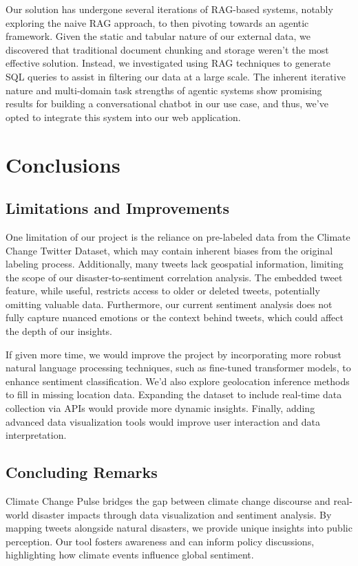 \documentclass[pdflatex,sn-mathphys-num]{sn-jnl}%
\theoremstyle{thmstyleone}%
\theoremstyle{thmstyletwo}%
\theoremstyle{thmstylethree}%
\begin{document}
Our solution has undergone several iterations of RAG-based systems, notably exploring the naive RAG approach, to then pivoting towards an agentic framework. Given the static and tabular nature of our external data, we discovered that traditional document chunking and storage weren't the most effective solution. Instead, we investigated using RAG techniques to generate SQL queries to assist in filtering our data at a large scale. The inherent iterative nature and multi-domain task strengths of agentic systems show promising results for building a conversational chatbot in our use case, and thus, we've opted to integrate this system into our web application.

\section{Conclusions}\label{section6}
\subsection{Limitations and Improvements}\label{subsec15}
One limitation of our project is the reliance on pre-labeled data from the Climate Change Twitter Dataset, which may contain inherent biases from the original labeling process. Additionally, many tweets lack geospatial information, limiting the scope of our disaster-to-sentiment correlation analysis. The embedded tweet feature, while useful, restricts access to older or deleted tweets, potentially omitting valuable data. Furthermore, our current sentiment analysis does not fully capture nuanced emotions or the context behind tweets, which could affect the depth of our insights.

If given more time, we would improve the project by incorporating more robust natural language processing techniques, such as fine-tuned transformer models, to enhance sentiment classification. We’d also explore geolocation inference methods to fill in missing location data. Expanding the dataset to include real-time data collection via APIs would provide more dynamic insights. Finally, adding advanced data visualization tools would improve user interaction and data interpretation.

\subsection{Concluding Remarks}\label{subsec16}
Climate Change Pulse bridges the gap between climate change discourse and real-world disaster impacts through data visualization and sentiment analysis. By mapping tweets alongside natural disasters, we provide unique insights into public perception. Our tool fosters awareness and can inform policy discussions, highlighting how climate events influence global sentiment.
\end{document}
